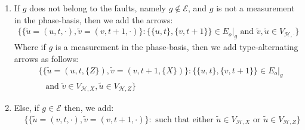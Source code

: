 \begin{definition}
\begin{enumerate}
        \begin{enumerate}
          \item If $g$ does not belong to the faults, namely $g \notin \mathcal{E}$, and $g$ is not a measurement in the phase-basis, then we add the arrows: 
            \begin{equation*}
              \begin{split}
                 \bigl\{  \{ \tilde{u} = (u,t, \cdot),  \tilde{v} = (v,t+1, \cdot)\} : \{\{u,t\},\{v,t+1\}\} \in E_{o}|_{g} \text{ and } \tilde{v},\tilde{u} \in V_{\mathcal{H}, \cdot} \bigr\}
              \end{split}
            \end{equation*}
            Where if $g$ is a measurement in the phase-basis, then we add type-alternating arrows as follows:
            \begin{equation*}
              \begin{split}
                & \bigl\{  \{ \tilde{u} = (u,t, \{Z\}),  \tilde{v} = (v,t+1, \{X\})\} : \{\{u,t\},\{v,t+1\}\} \in E_{o}|_{g} \\
              &  \, \, \, \text{ and } \tilde{v}\in V_{\mathcal{H},X},\tilde{u} \in V_{\mathcal{H},Z} \bigr\} 
              \end{split}
            \end{equation*}
          \item Else, if $g \in \mathcal{E}$ then, we add:   
            \begin{equation*}
              \begin{split}
                & \bigl\{  \{ \tilde{u} = (v,t, \cdot),  \tilde{v} = (v,t+1, \cdot)\} : \text{ such that either } \tilde{u} \in V_{\mathcal{H},X} \text { or } \tilde{u} \in V_{\mathcal{H},Z} \bigr\} 
              \end{split}
            \end{equation*}

\end{enumerate}
\end{enumerate}
\end{definition}
